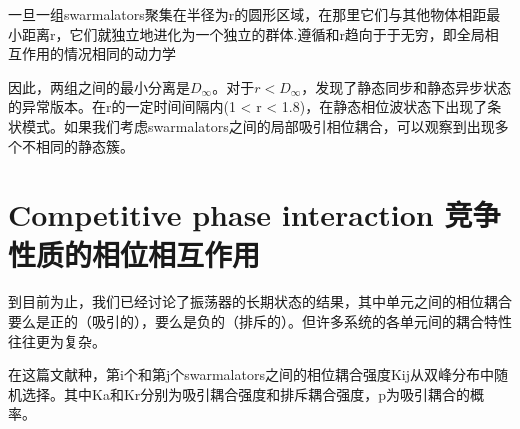 \documentclass[12pt, oneside]{ctexbook}
\begin{document}
一旦一组swarmalators聚集在半径为r的圆形区域，在那里它们与其他物体相距最小距离r，它们就独立地进化为一个独立的群体.遵循和r趋向于于无穷，即全局相互作用的情况相同的动力学

因此，两组之间的最小分离是$D_\infty$。对于$r<D_\infty$，发现了静态同步和静态异步状态的异常版本。在r的一定时间间隔内(1 < r < 1.8)，在静态相位波状态下出现了条状模式。如果我们考虑swarmalators之间的局部吸引相位耦合，可以观察到出现多个不相同的静态簇。

\section{Competitive phase interaction 竞争性质的相位相互作用}

到目前为止，我们已经讨论了振荡器的长期状态的结果，其中单元之间的相位耦合要么是正的（吸引的），要么是负的（排斥的）。但许多系统的各单元间的耦合特性往往更为复杂。

在这篇文献种，第i个和第j个swarmalators之间的相位耦合强度Kij从双峰分布中随机选择。其中Ka和Kr分别为吸引耦合强度和排斥耦合强度，p为吸引耦合的概率。
\end{document}
